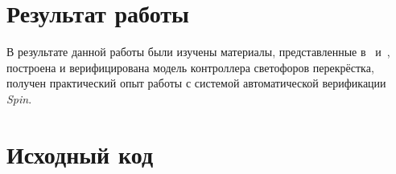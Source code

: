 \documentclass[a4paper,10pt]{article}
\begin{document}


\section{Результат работы}
В результате данной работы были изучены материалы, 
представленные в~\cite{shoshmina09spin} и~\cite{karpov2010modelcheck},
построена и верифицирована модель контроллера светофоров перекрёстка,
получен практический опыт работы с системой автоматической верификации \textit{Spin}.

\pagebreak

\appendix
\section{Исходный код}
\label{appendix-sources}



\pagebreak



\end{document}
